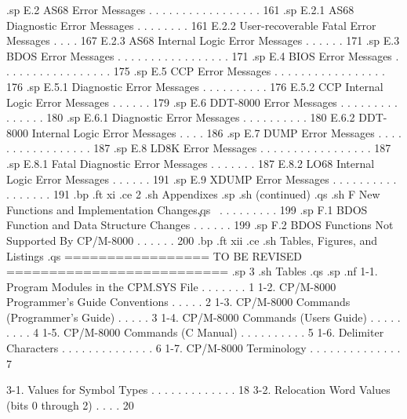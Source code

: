 .sp
   E.2  AS68 Error Messages . . . . . . . . . . . . . . . . . 161 
.sp
        E.2.1  AS68 Diagnostic Error Messages . . . . . . . . 161 
        E.2.2  User-recoverable Fatal Error Messages  . . . . 167 
        E.2.3  AS68 Internal Logic Error Messages . . . . . . 171 
.sp
   E.3  BDOS Error Messages . . . . . . . . . . . . . . . . . 171 
.sp
   E.4  BIOS Error Messages . . . . . . . . . . . . . . . . . 175 
.sp
   E.5  CCP Error Messages  . . . . . . . . . . . . . . . . . 176 
.sp
        E.5.1  Diagnostic Error Messages  . . . . . . . . . . 176 
        E.5.2  CCP Internal Logic Error Messages  . . . . . . 179 
.sp
   E.6  DDT-8000 Error Messages  . . . . . . . . . . . . . . . 180 
.sp
        E.6.1  Diagnostic Error Messages  . . . . . . . . . . 180 
        E.6.2  DDT-8000 Internal Logic Error Messages  . . . . 186 
.sp
   E.7  DUMP Error Messages . . . . . . . . . . . . . . . . . 187 
.sp
   E.8  LD8K Error Messages . . . . . . . . . . . . . . . . . 187 
.sp
        E.8.1  Fatal Diagnostic Error Messages  . . . . . . . 187 
        E.8.2  LO68 Internal Logic Error Messages . . . . . . 191 
.sp
   E.9  XDUMP Error Messages . . . . . . . . . . . . . . . . . 191 
.bp
.ft                                 xi
.ce 2
.sh
Appendixes
.sp
.sh
(continued)
.qs
.sh
F  New Functions and Implementation Changes\c
.qs
\ . . . . . . . . . 199 
.sp
   F.1  BDOS Function and Data Structure Changes  . . . . . . 199 
.sp
   F.2  BDOS Functions Not Supported By CP/M-8000  . . . . . . 200 
.bp
.ft                                xii
.ce
.sh 
Tables, Figures, and Listings
.qs
================= TO BE REVISED ==========================
.sp 3
.sh
Tables
.qs
.sp
.nf
     1-1.  Program Modules in the CPM.SYS File . . . . . . .    1
     1-2.  CP/M-8000 Programmer's Guide Conventions . . . . .    2
     1-3.  CP/M-8000 Commands (Programmer's Guide)  . . . . .    3
     1-4.  CP/M-8000 Commands (Users Guide) . . . . . . . . .    4
     1-5.  CP/M-8000 Commands (C Manual)  . . . . . . . . . .    5
     1-6.  Delimiter Characters  . . . . . . . . . . . . . .    6
     1-7.  CP/M-8000 Terminology  . . . . . . . . . . . . . .    7

     3-1.  Values for Symbol Types . . . . . . . . . . . . .   18
     3-2.  Relocation Word Values (bits 0 through 2) . . . .   20

